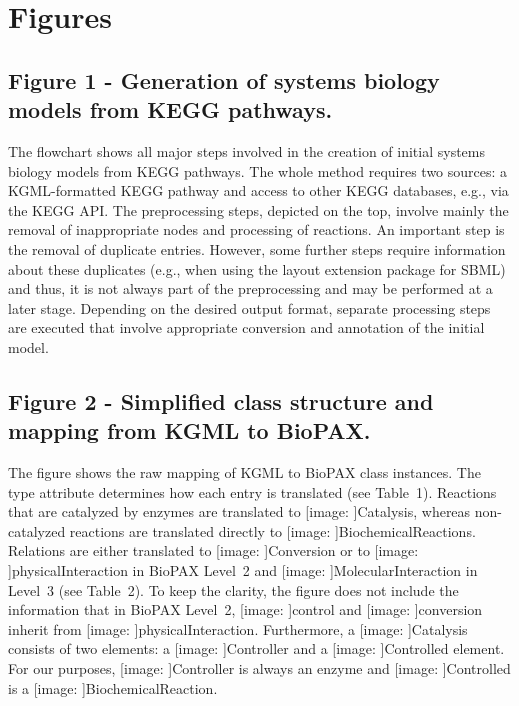 \documentclass[10pt]{bmc_article}
\def\texttt{[image: ]}
\newenvironment{bmcformat}{\baselineskip20pt\sloppy\setboolean{publ}{false}}{\baselineskip20pt\sloppy}
\newcommand{\BiochemicalReaction}{\texttt{Bio\-chemical\-Reaction}}
\newcommand{\BiochemicalReactions}{\texttt{Bio\-chemical\-Reaction}s}
\newcommand{\Catalysis}{\texttt{Cata\-lysis}}
\newcommand{\Conversion}{\texttt{Conversion}}
\newcommand{\control}{\texttt{control}}
\newcommand{\Controller}{\texttt{Controller}}
\newcommand{\Controlled}{\texttt{Controlled}}
\newcommand{\conversion}{\texttt{conversion}}
\newcommand{\MolecularInteraction}{\texttt{Mo\-le\-cu\-lar\-In\-ter\-ac\-tion}}
\newcommand{\physicalInteraction}{\texttt{physical\-Inter\-action}}
\begin{document}
\begin{bmcformat}

\section*{Figures}
  \subsection*{Figure 1 - Generation of systems biology models from KEGG pathways.}
The flowchart shows all major steps involved in the creation of initial systems biology models from KEGG pathways. The whole method requires two sources: a KGML-formatted KEGG pathway and access to other KEGG databases, e.g., via the KEGG API. The preprocessing steps, depicted on the top, involve mainly the removal of inappropriate nodes and processing of reactions.
An important step is the removal of duplicate entries. However, some further steps require information about these duplicates (e.g., when using the layout extension package for SBML) and thus, it is not always part of the preprocessing and may be performed at a later stage.
Depending on the desired output format, separate processing steps are executed that involve appropriate conversion and annotation of the initial model.



  \subsection*{Figure 2 - Simplified class structure and mapping from KGML to BioPAX.}
The figure shows the raw mapping of KGML to BioPAX class instances. The type attribute determines how each entry is translated (see Table~1). Reactions that are catalyzed by enzymes are translated to \Catalysis{}, whereas non-catalyzed reactions are translated directly to \BiochemicalReactions. Relations are either translated to \Conversion{} or to \physicalInteraction{} in BioPAX Level~2 and \MolecularInteraction{} in Level~3 (see Table~2). To keep the clarity, the figure does not include the information that in BioPAX Level~2, \control{} and \conversion{} inherit from \physicalInteraction{}.
Furthermore, a \Catalysis{} consists of two elements: a \Controller{} and a \Controlled{} element. For our purposes, \Controller{} is always an enzyme and \Controlled{} is a \BiochemicalReaction.


\end{bmcformat}
\end{document}
